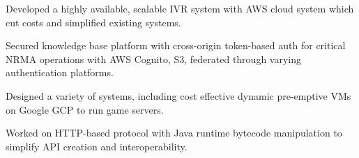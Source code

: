 \documentclass[a4paper]{deedy-resume}
\begin{document}
\begin{minipage}[t]{0.63\textwidth}
\sectionspace



\begin{tightitemize}
\item Developed a highly available, scalable IVR system
	  with AWS cloud system which cut costs and simplified
	  existing systems.
\item Secured knowledge base platform with
	  cross-origin token-based auth
	  for critical NRMA operations
	  with AWS Cognito, S3, federated through varying
	  authentication platforms.
\end{tightitemize}

\sectionspace



\begin{tightitemize}
\item Designed a variety of systems, including cost effective
	  dynamic pre-emptive VMs on Google GCP to run game servers.
\item Worked on HTTP-based protocol with Java runtime bytecode
	  manipulation to simplify API creation and interoperability.
\end{tightitemize}

\sectionspace

\end{minipage} %
\end{document}
